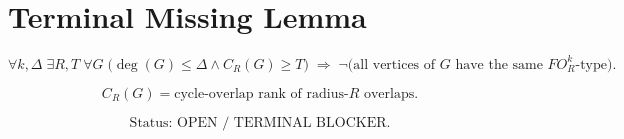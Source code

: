 \documentclass{article}
\begin{document}
\section*{Terminal Missing Lemma}

\[
\forall k,\Delta\;\exists R,T\;\forall G\;
\Big(\deg(G)\le \Delta \land C_R(G)\ge T\Big)
\;\Rightarrow\;
\neg\Big(\text{all vertices of }G\text{ have the same }FO^k_R\text{-type}\Big).
\]

\[
C_R(G)=\text{cycle-overlap rank of radius-}R\text{ overlaps}.
\]

\[
\text{Status: OPEN / TERMINAL BLOCKER.}
\]
\end{document}
